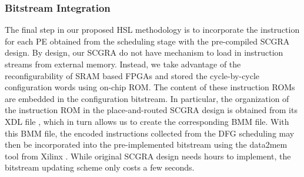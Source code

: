 \subsubsection{Bitstream Integration}
The final step in our proposed HSL methodology is to incorporate the instruction for each PE obtained from the scheduling stage with the pre-compiled SCGRA design.  By design, our SCGRA do not have mechanism to load in instruction streams from external memory.  Instead, we take advantage of the reconfigurability of SRAM based FPGAs and stored the cycle-by-cycle configuration words using on-chip ROM.  The content of these instruction ROMs are embedded in the configuration bitstream.  In particular, the organization of the instruction ROM in the place-and-routed SCGRA design is obtained from its XDL file \cite{beckhoff2011xilinx}, which in turn allows us to create the corresponding BMM file.  With this BMM file, the encoded instructions collected from the DFG scheduling may then be incorporated into the pre-implemented bitstream using the data2mem tool from Xilinx \cite{data2mem}.  
While original SCGRA design needs hours to implement, the bitstream updating scheme only costs a few seconds.



